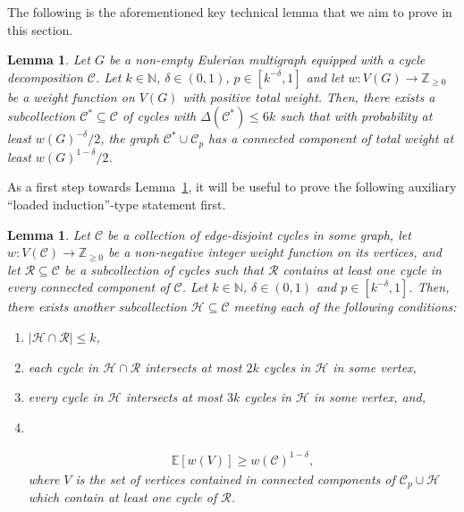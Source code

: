 \documentclass[11pt,reqno]{article}
\newtheorem{lemma}[theorem]{Lemma}
\begin{document}
The following is the aforementioned key technical lemma that we aim to prove in this section.
\begin{lemma}\label{lem: cycles}
    Let $G$ be a non-empty Eulerian multigraph equipped with a cycle decomposition $\mathcal{C}$. Let $k\in \mathbb{N}$, $\delta \in (0,1)$, $p\in [k^{-\delta},1]$ and let $w:V(G)\rightarrow \mathbb{Z}_{\ge 0}$ be a weight function on $V(G)$ with positive total weight. Then, there exists a subcollection $\mathcal C^*\subseteq \mathcal C$ of cycles with $\Delta(\mathcal C^*)\leq 6k$ such that with probability at least $w(G)^{-\delta}/2$, the graph $\mathcal C^*\cup\mathcal C_p$ has a connected component of total weight at least $w(G)^{1-\delta}/2$.
\end{lemma}
As a first step towards Lemma~\ref{lem: cycles}, it will be useful to prove the following auxiliary ``loaded induction''-type statement first.
\begin{lemma}\label{lem: root cycles}
    Let $\mathcal C$ be a collection of edge-disjoint cycles in some graph, let $w:V(\mathcal{C})\rightarrow \mathbb{Z}_{\ge 0}$ be a non-negative integer weight function on its vertices, and let $\mathcal R \subseteq \mathcal C$ be a subcollection of cycles such that $\mathcal R$ contains at least one cycle in every connected component of $\mathcal C$. Let $k\in \mathbb{N}$, $\delta \in (0,1)$ and $p\in [k^{-\delta},1]$. Then, there exists another subcollection $\mathcal H\subseteq \mathcal C$ meeting each of the following conditions:
    \begin{enumerate}[label=(C\arabic*), ref=(C\arabic*)]
    \item \label{cond:C1} $|\mathcal{H}\cap \mathcal{R}|\le k$,
    \item \label{cond:C2} each cycle in $\mathcal H\cap \mathcal R$ intersects at most $2k$ cycles in $\mathcal H$ in some vertex,
    \item \label{cond:C3} every cycle in $\mathcal H$ intersects at most $3k$ cycles in $\mathcal H$ in some vertex, and, 
    \item \label{cond:C4}\textcolor{white}{hack}

    \vspace{-1.4cm}
    \begin{align}\label{exp: cycle expectation}
        \mathbb E[w(V)]\geq w(\mathcal C)^{1-\delta},
    \end{align}
    where $V$ is the set of vertices contained in connected components of $\mathcal C_p\cup \mathcal H$ which contain at least one cycle of $\mathcal R$.
\end{enumerate}
\end{lemma}
\end{document}
